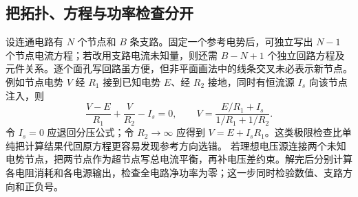 \subsection{把拓扑、方程与功率检查分开}
设连通电路有 $N$ 个节点和 $B$ 条支路。固定一个参考电势后，可独立写出 $N-1$ 个节点电流方程；若改用支路电流未知量，则还需 $B-N+1$ 个独立回路方程及元件关系。逐个面孔写回路虽方便，但非平面画法中的线条交叉未必表示新节点。
例如节点电势 $V$ 经 $R_1$ 接到已知电势 $E$、经 $R_2$ 接地，同时有恒流源 $I_s$ 向该节点注入，则
\[
 \frac{V-E}{R_1}+\frac V{R_2}-I_s=0,
 \qquad V=\frac{E/R_1+I_s}{1/R_1+1/R_2}.
\]
令 $I_s=0$ 应退回分压公式；令 $R_2\to\infty$ 应得到 $V=E+I_sR_1$。这类极限检查比单纯把计算结果代回原方程更容易发现参考方向选错。
若理想电压源连接两个未知电势节点，把两节点作为超节点写总电流平衡，再补电压差约束。解完后分别计算各电阻消耗和各电源输出，检查全电路净功率为零；这一步同时检验数值、支路方向和正负号。

